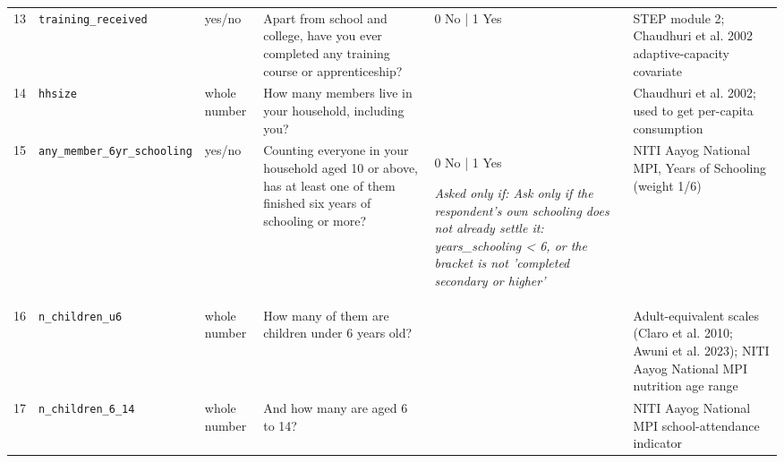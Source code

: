 \documentclass[9pt,a4paper,landscape]{article}
\begin{document}
\begin{longtable}{@{}p{0.5cm}p{3.3cm}p{1.7cm}p{7.3cm}p{5.6cm}p{5.4cm}@{}}
\footnotesize 13 & \footnotesize\texttt{training\_received} & \scriptsize yes/no & \footnotesize Apart from school and college, have you ever completed any training course or apprenticeship?\par\vspace{1pt}{\footnotesize\color{hdr}{\hifont स्कूल और कॉलेज की पढ़ाई छोड़कर, क्या आपने कभी कोई ट्रेनिंग या सीखने का कोर्स पूरा किया है?}} & \scriptsize 0 No | 1 Yes & \scriptsize STEP module 2; Chaudhuri et al. 2002 adaptive-capacity covariate\\
\footnotesize 14 & \footnotesize\texttt{hhsize} & \scriptsize whole number & \footnotesize How many members live in your household, including you?\par\vspace{1pt}{\footnotesize\color{hdr}{\hifont आपके घर में आपको मिलाकर कुल कितने लोग रहते हैं?}} & \scriptsize  & \scriptsize Chaudhuri et al. 2002; used to get per-capita consumption\\
\footnotesize 15 & \footnotesize\texttt{any\_member\_6yr\_schooling} & \scriptsize yes/no & \footnotesize Counting everyone in your household aged 10 or above, has at least one of them finished six years of schooling or more?\par\vspace{1pt}{\footnotesize\color{hdr}{\hifont आपके घर में 10 साल या उससे बड़े सभी लोगों में से, क्या कम से कम एक ने छह साल या उससे ज़्यादा पढ़ाई पूरी की है?}} & \scriptsize 0 No | 1 Yes\par\vspace{1pt}\textit{Asked only if: Ask only if the respondent's own schooling does not already settle it: years\_schooling < 6, or the bracket is not 'completed secondary or higher'} & \scriptsize NITI Aayog National MPI, Years of Schooling (weight 1/6)\\
\footnotesize 16 & \footnotesize\texttt{n\_children\_u6} & \scriptsize whole number & \footnotesize How many of them are children under 6 years old?\par\vspace{1pt}{\footnotesize\color{hdr}{\hifont इनमें 6 साल से छोटे बच्चे कितने हैं?}} & \scriptsize  & \scriptsize Adult-equivalent scales (Claro et al. 2010; Awuni et al. 2023); NITI Aayog National MPI nutrition age range\\
\footnotesize 17 & \footnotesize\texttt{n\_children\_6\_14} & \scriptsize whole number & \footnotesize And how many are aged 6 to 14?\par\vspace{1pt}{\footnotesize\color{hdr}{\hifont और 6 से 14 साल के कितने हैं?}} & \scriptsize  & \scriptsize NITI Aayog National MPI school-attendance indicator\\

\end{longtable}
\end{document}
